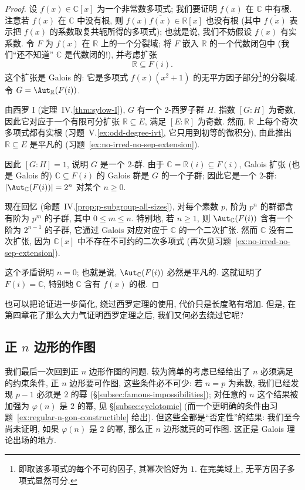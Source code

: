 \begin{proof}
设 $f(x)\in\mathbb{C}[x]$ 为一个非常数多项式; 我们要证明 $f(x)$ 在 $\mathbb{C}$ 中有根. 注意若 $f(x)$ 在 $\mathbb{C}$ 中没有根, 则 $f(x)\overline{f(x)}\in\mathbb{R}[x]$ 也没有根 (其中 $\overline{f(x)}$ 表示把 $f(x)$ 的系数取复共轭所得的多项式); 也就是说, 我们不妨假设 $f(x)$ 有实系数. 令 $F$ 为 $f(x)$ 在 $\mathbb{R}$ 上的一个分裂域; 将 $F$ 嵌入 $\mathbb{R}$ 的一个代数闭包中 (我们``还不知道'' $\mathbb{C}$ 是代数闭的!), 并考虑扩张
\[
\mathbb{R}\subseteq F(i).
\]
这个扩张是 Galois 的: 它是多项式 $f(x)(x^2+1)$ 的无平方因子部分\footnote{即取该多项式的每个不可约因子, 其幂次恰好为 $1$. 在完美域上, 无平方因子多项式显然可分.}的分裂域. 令 $G=\Aut_{\mathbb{R}}(F(i))$.

由西罗 I (定理~IV.\ref{thm:sylow-I}), $G$ 有一个 $2$-西罗子群 $H$. 指数 $[G:H]$ 为奇数, 因此它对应于一个有限可分扩张 $\mathbb{R}\subseteq E$, 满足 $[E:\mathbb{R}]$ 为奇数. 然而, $\mathbb{R}$ 上每个奇次多项式都有实根 (习题~V.\ref{ex:odd-degree-ivt}, 它只用到初等的微积分), 由此推出 $\mathbb{R}\subseteq E$ 是平凡的 (习题~\ref{ex:no-irred-no-sep-extension}).

因此 $[G:H]=1$, 说明 $G$ 是一个 $2$-群. 由于 $\mathbb{C}=\mathbb{R}(i)\subseteq F(i)$, Galois 扩张 (也是 Galois 的) $\mathbb{C}\subseteq F(i)$ 的 Galois 群是 $G$ 的一个子群; 因此它是一个 $2$-群: $\lvert\Aut_{\mathbb{C}}(F(i))\rvert=2^n$ 对某个 $n\ge 0$.

现在回忆 (命题~IV.\ref{prop:p-subgroup-all-sizes}), 对每个素数 $p$, 阶为 $p^n$ 的群都含有阶为 $p^m$ 的子群, 其中 $0\le m\le n$. 特别地, 若 $n\ge 1$, 则 $\Aut_{\mathbb{C}}(F(i))$ 含有一个阶为 $2^{n-1}$ 的子群, 它通过 Galois 对应对应于 $\mathbb{C}$ 的一个二次扩张. 然而 $\mathbb{C}$ 没有二次扩张, 因为 $\mathbb{C}[x]$ 中不存在不可约的二次多项式 (再次见习题~\ref{ex:no-irred-no-sep-extension}).

这个矛盾说明 $n=0$; 也就是说, $\Aut_{\mathbb{C}}(F(i))$ 必然是平凡的. 这就证明了 $F(i)=\mathbb{C}$, 特别地 $\mathbb{C}$ 含有 $f(x)$ 的根.
\end{proof}

也可以把论证进一步简化, 绕过西罗定理的使用, 代价只是长度略有增加. 但是, 在第四章花了那么大力气证明西罗定理之后, 我们又何必去绕过它呢?

\subsection{正 \texorpdfstring{$n$}{n} 边形的作图}
\label{subsec:constructible-ngons}

我们最后一次回到正 $n$ 边形作图的问题. 较为简单的考虑已经给出了 $n$ 必须满足的约束条件, 正 $n$ 边形要可作图, 这些条件必不可少: 若 $n=p$ 为素数, 我们已经发现 $p-1$ 必须是 $2$ 的幂 (§\ref{subsec:famous-impossibilities}); 对任意的 $n$ 这个结果被加强为 $\varphi(n)$ 是 $2$ 的幂, 见 §\ref{subsec:cyclotomic} (而一个更明确的条件由习题~\ref{ex:regular-n-gon-constructible} 给出). 但这些全都是``否定性''的结果: 我们至今尚未证明, 如果 $\varphi(n)$ 是 $2$ 的幂, 那么正 $n$ 边形就真的可作图. 这正是 Galois 理论出场的地方.

